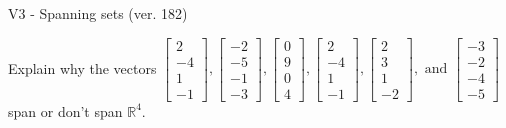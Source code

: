 \begin{exercise}
  \begin{exerciseTitle}V3 - Spanning sets (ver. 182)\end{exerciseTitle}
  \begin{exerciseStatement}
    Explain why the vectors \(\left[\begin{array}{r}
2 \\
-4 \\
1 \\
-1
\end{array}\right] , \left[\begin{array}{r}
-2 \\
-5 \\
-1 \\
-3
\end{array}\right] , \left[\begin{array}{r}
0 \\
9 \\
0 \\
4
\end{array}\right] , \left[\begin{array}{r}
2 \\
-4 \\
1 \\
-1
\end{array}\right] , \left[\begin{array}{r}
2 \\
3 \\
1 \\
-2
\end{array}\right] , \text{ and } \left[\begin{array}{r}
-3 \\
-2 \\
-4 \\
-5
\end{array}\right]\) span or don't span \(\mathbb{R}^4\). 
	



\end{exerciseStatement}
\end{exercise}
